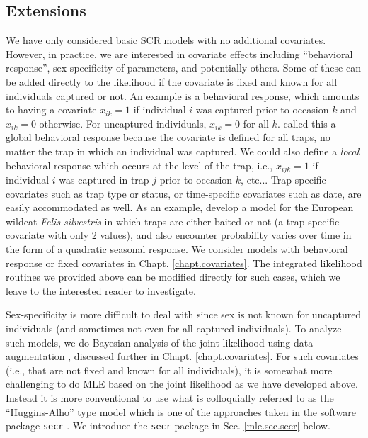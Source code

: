 \subsection{Extensions}

We have only considered basic SCR models with no additional
covariates. However, in practice, we are interested in 
covariate effects including ``behavioral response'', 
sex-specificity of parameters, and potentially others. Some of
these  can be added directly to the likelihood if the covariate is fixed
and known for all individuals captured or not. An example is a
behavioral response, which amounts to having a covariate $x_{ik}=1$ if
individual $i$ was captured prior to occasion $k$ and $x_{ik}=0$
otherwise. For uncaptured individuals, $x_{ik}=0$ for all $k$.
 \citet{royle_etal:2011jwm} called this a global behavioral
response because the covariate is defined for all traps, no matter the
trap in which an individual was captured. We could also define a {\it
  local} behavioral response which occurs at the level of the trap,
i.e., $x_{ijk}=1$ if individual $i$ was captured in trap $j$ prior to
occasion $k$, etc... 
Trap-specific covariates such as trap type or status, or
time-specific covariates such as date, are easily accommodated as
well. As an example, \citet{kery_etal:2010} develop a model for the
European wildcat \emph{Felis silvestris}  in which traps are either baited or not (a
trap-specific covariate with only 2 values), and also encounter
probability varies over time in the form of a quadratic seasonal response.
We consider models with behavioral response or fixed covariates in
Chapt. \ref{chapt.covariates}.
The integrated likelihood routines we provided above can be
modified directly for such cases, which we leave to the interested
reader to investigate. 

Sex-specificity is more difficult to deal with since sex is not known
for uncaptured individuals (and sometimes not even for all captured
individuals).  To analyze such models, we do Bayesian analysis of the
joint likelihood using  data augmentation
\citep{gardner_etal:2010jwm,russell_etal:2012}, discussed further in
Chapt. \ref{chapt.covariates}. For such covariates (i.e., that are
not fixed and known for all individuals), it is somewhat more
challenging to do MLE based on the joint likelihood as we
have developed above. Instead it is more conventional to use what is
colloquially referred to as the ``Huggins-Alho'' type model which is
one of the approaches taken in the software package \mbox{\tt secr}
\citep[][]{efford:2011}. 
 We introduce the  \mbox{\tt secr} package 
in Sec. \ref{mle.sec.secr} below. 



